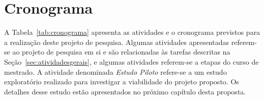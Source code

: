\section{Cronograma}

A Tabela~\ref{tab:cronograma} apresenta as atividades e o cronograma previstos para a realização deste projeto de pesquisa. Algumas atividades apresentadas referem-se ao projeto de pesquisa em si e são relacionadas às tarefas descritas na Seção~\ref{sec:atividadesgerais}, e algumas atividades referem-se a etapas do curso de mestrado. A atividade denominada \emph{Estudo Piloto} refere-se a um estudo exploratório realizado para investigar a viabilidade do projeto proposto. Os detalhes desse estudo estão apresentados no próximo capítulo desta proposta.


\newcommand{\y}{\rule{18,5pt}{5pt}}
\newcommand{\x}{\hspace*{5pt}}
